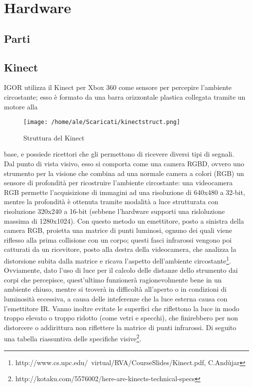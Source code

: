 \documentclass[Lau]{sapthesis}
\begin{document}
\section{Hardware}
\subsection{Parti}
\subsection{Kinect}
\textcolor{sapred}{IGOR} utilizza il Kinect per Xbox 360 come sensore per percepire l'ambiente circostante; esso è formato da una barra orizzontale plastica collegata tramite un motore alla \begin{figure}[h!]
  \texttt{[image: /home/ale/Scaricati/kinectstruct.png]}
  \caption{Struttura del Kinect}
  \label{fig:kinectstruct}
\end{figure}
base, e possiede ricettori che gli permettono di ricevere diversi tipi di segnali.\\
Dal punto di vista visivo, esso si comporta come una camera RGBD, ovvero uno strumento per la visione che combina ad una normale camera a colori (RGB) un sensore di profondità per ricostruire l'ambiente circostante: una videocamera RGB permette l'acquisizione di immagini ad una risoluzione di 640x480 a 32-bit, mentre la profondità è ottenuta tramite modalità a luce strutturata con risoluzione 320x240 a 16-bit (sebbene l'hardware supporti una risloluzione massima di 1280x1024). Con questo metodo un emettitore, posto a sinistra della camera RGB, proietta una matrice di punti luminosi, ognuno dei quali viene riflesso alla prima collisione con un corpo; questi fasci infrarossi vengono poi catturati da un ricevitore, posto alla destra della videocamera, che analizza la distorsione subita dalla matrice e ricava l'aspetto dell'ambiente circostante\footnote{\label{kinectvideo}http://www.cs.upc.edu/~virtual/RVA/CourseSlides/Kinect.pdf, C.Andùjar}.\\Ovviamente, dato l'uso di luce per il calcolo delle distanze dello strumento dai corpi che percepisce, quest'ultimo funzionerà ragionevolmente bene in un ambiente chiuso, mentre si troverà in difficoltà all'aperto o in condizioni di luminosità eccessiva, a causa delle inteferenze che la luce esterna causa con l'emettitore IR. Vanno inoltre evitate le superfici che riflettono la luce in modo troppo elevato o troppo ridotto (come vetri e specchi), che finirebbero per non distorcere o addirittura non riflettere la matrice di punti infrarossi. Di seguito una tabella riassuntiva delle specifiche visive\footnote{\label{kinectspecs}http://kotaku.com/5576002/here-are-kinects-technical-specs}.\\
\end{document}
